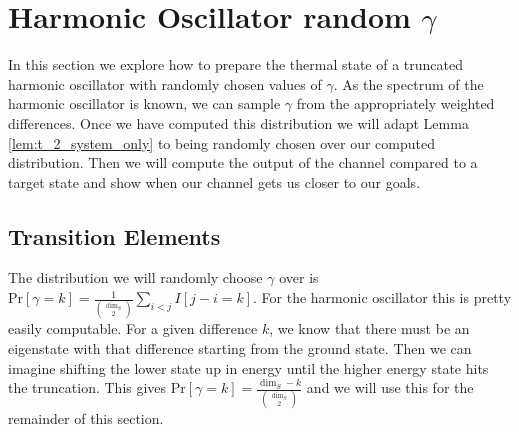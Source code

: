 \documentclass{article}
\newcommand{\prob}[1]{\text{Pr}\left[ #1 \right]}
\begin{document}
\section{Harmonic Oscillator random $\gamma$}
In this section we explore how to prepare the thermal state of a truncated harmonic oscillator with randomly chosen values of $\gamma$. As the spectrum of the harmonic oscillator is known, we can sample $\gamma$ from the appropriately weighted differences. Once we have computed this distribution we will adapt Lemma \ref{lem:t_2_system_only} to being randomly chosen over our computed distribution. Then we will compute the output of the channel compared to a target state and show when our channel gets us closer to our goals.

\subsection{Transition Elements}
The distribution we will randomly choose $\gamma$ over is $\prob{\gamma = k} = \frac{1}{\binom{\dim_S}{2}} \sum_{i < j} I[j - i = k]$. For the harmonic oscillator this is pretty easily computable. For a given difference $k$, we know that there must be an eigenstate with that difference starting from the ground state. Then we can imagine shifting the lower state up in energy until the higher energy state hits the truncation. This gives $\prob{\gamma = k} = \frac{\dim_S - k}{\binom{\dim_S}{2}}$ and we will use this for the remainder of this section.
\end{document}
